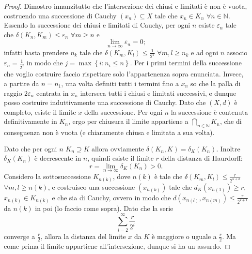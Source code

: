 \begin{proof}
Dimostro innanzitutto che l'intersezione dei chiusi e limitati è non è vuota, costruendo una successione di Cauchy $\left (x_n\right ) \subseteq X$ tale che $x_n \in K_n$ $ \forall n \in \mathbb{N}$. Essendo la successione dei chiusi e limitati di Cauchy, per ogni $n$ esiste $\varepsilon_n$ tale che $\delta \left ( K_n, K_m \right )\leq \varepsilon_n$ $\forall m\geq n$ e
\begin{equation*}
\lim_{n \to \infty}\varepsilon_n =0;
\end{equation*}
infatti basta prendere $n_k$ tale che $\delta \left ( K_m, K_l \right )\leq \frac{1}{2^k}$ $\forall m,l\geq n_k$ e ad ogni $n$ associo $\varepsilon_n=\frac{1}{2^j}$ in modo che $j=\max { \left \{ i:n_i \leq n \right \} }$. Per i primi termini della successione che voglio costruire faccio rispettare solo l'appartenenza sopra enunciata. Invece, a partire da $n=n_1$, una volta definiti tutti i termini fino a $x_n$ so che la palla di raggio $2\varepsilon_n$ centrata in $x_n$ interseca tutti i chiusi e limitati successivi, e dunque posso costruire induttivamente una successione di Cauchy. Dato che $\left (X,d\right )$ è completo, esiste il limite $x$ della successione. Per ogni $n$ la successione è contenuta definitivamente in $K_n$, ergo per chiusura il limite appartiene a $ \bigcap_{n \in \mathbb{N}}K_n $, che di conseguenza non è vuota (e chiaramente chiusa e limitata a sua volta).

Dato che per ogni $n$ $K_n\supseteq K$ allora ovviamente $\delta\left  (K_n,K\right )=\delta_{K}\left (K_n\right )$. Inoltre $\delta_{K}\left (K_n\right )$ è decrescente in $n$, quindi esiste il limite $r$ della distanza di Haurdorff:
\begin{equation*}
r=\lim_{n \to \infty}\delta_{K}\left (K_n\right )>0.
\end{equation*}
Considero la sottosuccessione $K_{n(k)}$, dove $n(k)$ è tale che $\delta \left ( K_m, K_l \right )\leq \frac{r}{2^{k+2}}$ $\forall m,l\geq n(k)$, e costruisco una successione $\left ( x_{n(k)} \right )$ tale che $d_{K} \left (x_{n(1)} \right )\geq r$, $ x_{n(k)} \in K_{n(k)}$ e che sia di Cauchy, ovvero in modo che $d \left ( x_{n(l)}, x_{n(m)} \right )\leq \frac{r}{2^{k+1}}$ da $n(k)$ in poi (lo faccio come sopra). Dato che la serie
\begin{equation*}
\sum_{i=2}^{\infty} \frac{r}{2^i}
\end{equation*}
converge a $\frac{r}{2}$, allora la distanza del limite $x$ da $K$ è maggiore o uguale a $\frac{r}{2}$. Ma come prima il limite appartiene all'intersezione, dunque si ha un assurdo.
\end{proof}

